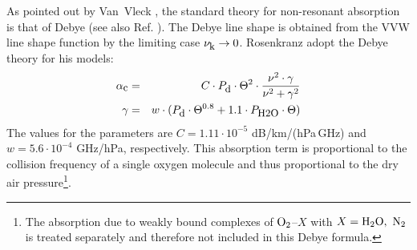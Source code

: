 
\label{levele:pwr98_o2cont}
As pointed out by Van~Vleck \cite{vv:87}, the standard theory for
non-resonant absorption is that of Debye (see also Ref. \cite{townes:55}). 
The Debye line shape is obtained from the VVW line shape function by
the limiting case $\nu_{\mbox{\rm \small k}} \rightarrow 0$.
Rosenkranz \cite{pwr:93} adopt the Debye theory for his models: 
\begin{eqnarray}
  \label{eq:pwr_o2cont}
  \alphac &=&  C \cdot \pda \cdot \Theta^2 \cdot 
             \frac{\nu^2 \cdot \gamma}{\nu^2+\gamma^2}\\
%
  \label{eq:pwr_o2cont_1}
  \gamma &=&  w \cdot (\pda \cdot \Theta^{0.8} + 1.1 \cdot \phzo \cdot
  \Theta)
\end{eqnarray}
The values for the parameters are $C = 1.11\cdot 10^{-5}$ dB/km/(hPa\,GHz) and 
$w = 5.6 \cdot 10^{-4}$ GHz/hPa, respectively. This absorption
term is proportional to the collision frequency of a single oxygen molecule
and thus proportional to the dry air pressure\footnote{The absorption
  due to weakly bound complexes of $\mbox{O}_2$--$X$ with $X=\mbox{H}_2\mbox{O},~\mbox{N}_2$ is 
  treated separately and therefore not included in this Debye
  formula.}.






\label{levelb:O2_mpm93}

